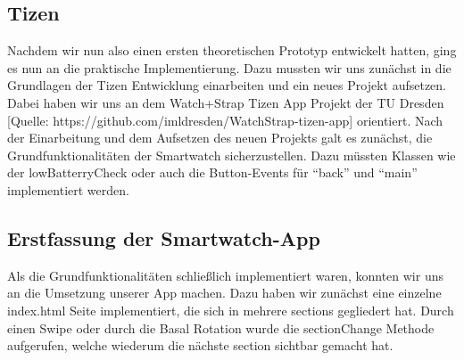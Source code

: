 \documentclass[11pt, a4paper]{article}
\begin{document}
\subsection{Tizen}

Nachdem wir nun also einen ersten theoretischen Prototyp entwickelt hatten, ging es nun an die praktische Implementierung. Dazu mussten wir uns zunächst in die Grundlagen der Tizen Entwicklung einarbeiten und ein neues Projekt aufsetzen. Dabei haben wir uns an dem Watch+Strap Tizen App Projekt der TU Dresden [Quelle: https://github.com/imldresden/WatchStrap-tizen-app] orientiert. 
Nach der Einarbeitung und dem Aufsetzen des neuen Projekts galt es zunächst, die Grundfunktionalitäten der Smartwatch sicherzustellen. Dazu müssten Klassen wie der lowBatterryCheck oder auch die Button-Events für “back” und “main” implementiert werden. 

\subsection{Erstfassung der Smartwatch-App}

Als die Grundfunktionalitäten schließlich implementiert waren, konnten wir uns an die Umsetzung unserer App machen. Dazu haben wir zunächst eine einzelne index.html Seite implementiert, die sich in mehrere sections gegliedert hat. Durch einen Swipe oder durch die Basal Rotation wurde die sectionChange Methode aufgerufen, welche wiederum die nächste section sichtbar gemacht hat. 
\end{document}
